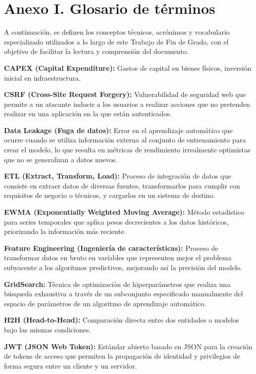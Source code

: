 \section*{Anexo I. Glosario de términos}

A continuación, se definen los conceptos técnicos, acrónimos y vocabulario especializado utilizados a lo largo de este Trabajo de Fin de Grado, con el objetivo de facilitar la lectura y comprensión del documento.

\textbf{CAPEX (Capital Expenditure):} 
Gastos de capital en bienes físicos, inversión inicial en infraestructura.

\textbf{CSRF (Cross-Site Request Forgery):} 
Vulnerabilidad de seguridad web que permite a un atacante inducir a los usuarios a realizar acciones que no pretenden realizar en una aplicación en la que están autenticados.

\textbf{Data Leakage (Fuga de datos):} 
Error en el aprendizaje automático que ocurre cuando se utiliza información externa al conjunto de entrenamiento para crear el modelo, lo que resulta en métricas de rendimiento irrealmente optimistas que no se generalizan a datos nuevos.

\textbf{ETL (Extract, Transform, Load):} 
Proceso de integración de datos que consiste en extraer datos de diversas fuentes, transformarlos para cumplir con requisitos de negocio o técnicos, y cargarlos en un sistema de destino.

\textbf{EWMA (Exponentially Weighted Moving Average):} 
Método estadístico para series temporales que aplica pesos decrecientes a los datos históricos, priorizando la información más reciente.

\textbf{Feature Engineering (Ingeniería de características):} 
Proceso de transformar datos en bruto en variables que representen mejor el problema subyacente a los algoritmos predictivos, mejorando así la precisión del modelo.

\textbf{GridSearch:} 
Técnica de optimización de hiperparámetros que realiza una búsqueda exhaustiva a través de un subconjunto especificado manualmente del espacio de parámetros de un algoritmo de aprendizaje automático.

\textbf{H2H (Head-to-Head):} 
Comparación directa entre dos entidades o modelos bajo las mismas condiciones.

\textbf{JWT (JSON Web Token):} 
Estándar abierto basado en JSON para la creación de tokens de acceso que permiten la propagación de identidad y privilegios de forma segura entre un cliente y un servidor.

